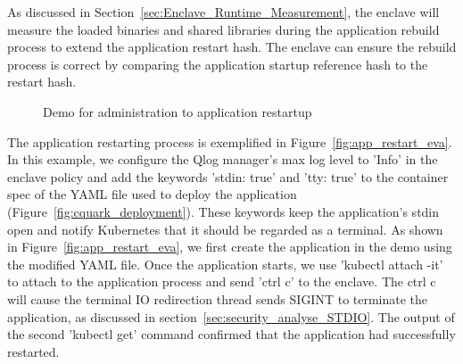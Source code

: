 As discussed in Section~\ref{sec:Enclave_Runtime_Measurement}, the enclave will measure the loaded binaries and shared libraries during the application rebuild process to extend the application restart hash. The enclave can ensure the rebuild process is correct by comparing the 
application startup reference hash to the restart hash.
\begin{figure}[!htb]


  
    \caption[Demo for  administration to application restartup]{Demo for  administration to application restartup}
\end{figure}



The application restarting process is exemplified in Figure~\ref{fig:app_restart_eva}. In this example, we configure the Qlog manager’s max log level to ’Info’ in the enclave policy and add the keywords ’stdin: true’ and ’tty: true’ to the container spec of the YAML file used to deploy the 
application (Figure~\ref{fig:cquark_deployment}). These keywords keep the application’s stdin open and notify Kubernetes that it should be regarded as a terminal. As shown in Figure~\ref{fig:app_restart_eva}, we first create the application in the demo using the modified YAML file. Once the application starts, we use ’kubectl attach -it’ to 
attach to the application process and send ’ctrl c’ to the enclave. The ctrl c will cause the terminal IO redirection thread sends SIGINT to terminate the application, as discussed in section~\ref{sec:security_analyse_STDIO}. The output of the second ’kubectl get’ command confirmed that the application had successfully restarted. 

